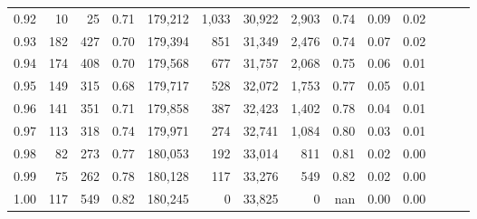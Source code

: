 \begin{tabular}{rrrrrrrrrrrrrr}
0.92 &     10 &   25 &  0.71 &  179,212 &    1,033 &  30,922 &   2,903 &  0.74 &  0.09 &      0.02 \\
0.93 &    182 &  427 &  0.70 &  179,394 &      851 &  31,349 &   2,476 &  0.74 &  0.07 &      0.02 \\
0.94 &    174 &  408 &  0.70 &  179,568 &      677 &  31,757 &   2,068 &  0.75 &  0.06 &      0.01 \\
0.95 &    149 &  315 &  0.68 &  179,717 &      528 &  32,072 &   1,753 &  0.77 &  0.05 &      0.01 \\
0.96 &    141 &  351 &  0.71 &  179,858 &      387 &  32,423 &   1,402 &  0.78 &  0.04 &      0.01 \\
0.97 &    113 &  318 &  0.74 &  179,971 &      274 &  32,741 &   1,084 &  0.80 &  0.03 &      0.01 \\
0.98 &     82 &  273 &  0.77 &  180,053 &      192 &  33,014 &     811 &  0.81 &  0.02 &      0.00 \\
0.99 &     75 &  262 &  0.78 &  180,128 &      117 &  33,276 &     549 &  0.82 &  0.02 &      0.00 \\
1.00 &    117 &  549 &  0.82 &  180,245 &        0 &  33,825 &       0 &   nan &  0.00 &      0.00 \\
\bottomrule
\end{tabular}
